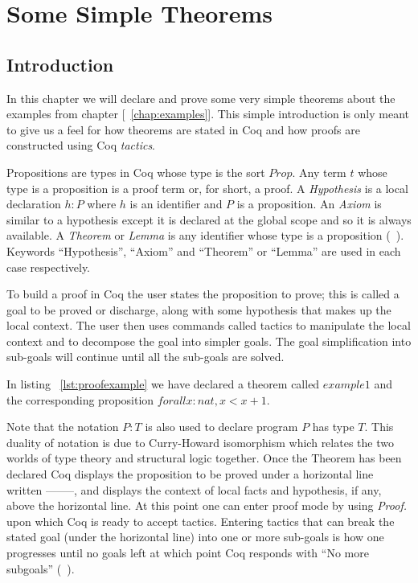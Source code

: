 \chapter{Some Simple Theorems}

\section{Introduction}

In this chapter we will declare and prove some very simple theorems about the examples from chapter [~\ref{chap:examples}]. This simple introduction is only meant to give us a feel for how theorems are stated in Coq and how proofs are constructed using Coq \emph{tactics}. 

Propositions are types in Coq whose type is the sort $Prop$. Any term $t$ whose type is a proposition is a proof term or, for short, a proof. A \emph{Hypothesis} is a local declaration $h : P$ where $h$ is an identifier and $P$ is a proposition. An \emph{Axiom} is similar to a hypothesis except it is declared at the global scope and so it is always available. A \emph{Theorem} or \emph{Lemma} is any identifier whose type is a proposition (~\cite{BC04}). Keywords ``Hypothesis'', ``Axiom'' and ``Theorem'' or ``Lemma'' are used in each case respectively. 

To build a proof in Coq the user states the proposition to prove; this is called a goal to be proved or discharge, along with some hypothesis that makes up the local context. The user then uses commands called tactics to manipulate the local context and to decompose the goal into simpler goals. The goal simplification into sub-goals will continue until all the sub-goals are solved.

In listing ~\ref{lst:proofexample} we have declared a theorem called $example1$ and the corresponding proposition $forall x:nat, x < x + 1.$
 
Note that the notation $P : T$ is also used to declare program $P$ has type $T$. This duality of notation is due to Curry-Howard isomorphism which relates the two worlds of type theory and structural logic together. Once the Theorem has been declared Coq displays the proposition to be proved under a horizontal line written --------, and displays the context of local facts and hypothesis, if any, above the horizontal line. At this point one can enter proof mode by using \emph{Proof.} upon which Coq is ready to accept tactics. Entering tactics that can break the stated goal (under the horizontal line) into one or more sub-goals is how one progresses until no goals left at which point Coq responds with ``No more subgoals'' (~\cite{CoqHurry}).

